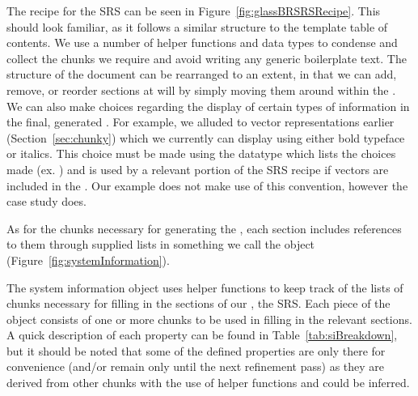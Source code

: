 
The recipe for the \gb{} SRS can be seen in Figure~\ref{fig:glassBRSRSRecipe}.
This should look familiar, as it follows a similar structure to the \smithea{} 
template table of contents. We use a number of helper functions and data types 
to condense and collect the chunks we require and avoid writing any generic 
boilerplate text. The structure of the document can be rearranged to an extent, 
in that we can add, remove, or reorder sections at will by simply moving them 
around within the . We can also make choices regarding the 
display of certain types of information in the final, generated \sf{}. For 
example, we alluded to vector representations earlier 
(Section~\ref{sec:chunky}) which we currently can display using either bold
typeface or italics. This choice must be made using the  
datatype which lists the choices made (ex. 
) and is used by a relevant portion of the 
SRS recipe if vectors are included in the \sf{}. Our \gb{} example does not 
make use of this convention, however the \gp{} case study does.

As for the chunks necessary for generating the \sf{}, each section includes 
references to them through supplied lists in something we call the 
object (Figure~\ref{fig:systemInformation}).


The system information object uses helper functions to keep track of the lists 
of chunks necessary for filling in the sections of our \sf{}, the SRS. Each 
piece of the object consists of one or more chunks to be used in filling in the 
relevant sections. A quick description of each property can be found in 
Table~\ref{tab:siBreakdown}, but it should be noted that some of the defined 
properties are only there for convenience (and/or remain only until the next 
refinement pass) as they are derived from other chunks with the use of 
helper functions and could be inferred.

